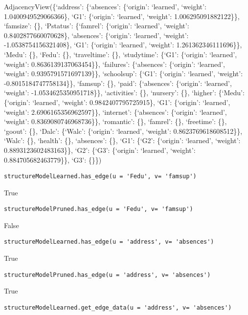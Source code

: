 \documentclass[
]{article}
\begin{document}
AdjacencyView(\{`address': \{`absences': \{`origin': `learned',
`weight': 1.0400949529066366\}, `G1': \{`origin': `learned', `weight':
1.006295091882122\}\}, `famsize': \{\}, `Pstatus': \{`famrel':
\{`origin': `learned', `weight': 0.8402877660070628\}, `absences':
\{`origin': `learned', `weight': -1.0538754156321408\}, `G1':
\{`origin': `learned', `weight': 1.261362346111696\}\}, `Medu': \{\},
`Fedu': \{\}, `traveltime': \{\}, `studytime': \{`G1': \{`origin':
`learned', `weight': 0.8636139137063454\}\}, `failures': \{`absences':
\{`origin': `learned', `weight': 0.9395791571697139\}\}, `schoolsup':
\{`G1': \{`origin': `learned', `weight': -0.8015184747758134\}\},
`famsup': \{\}, `paid': \{`absences': \{`origin': `learned', `weight':
-1.0534625350951718\}\}, `activities': \{\}, `nursery': \{\}, `higher':
\{`Medu': \{`origin': `learned', `weight': 0.9842407795725915\}, `G1':
\{`origin': `learned', `weight': 2.6906165356962597\}\}, `internet':
\{`absences': \{`origin': `learned', `weight': 0.8369080746968736\}\},
`romantic': \{\}, `famrel': \{\}, `freetime': \{\}, `goout': \{\},
`Dalc': \{`Walc': \{`origin': `learned', `weight':
0.8623769618608512\}\}, `Walc': \{\}, `health': \{\}, `absences': \{\},
`G1': \{`G2': \{`origin': `learned', `weight': 0.8893123602483163\}\},
`G2': \{`G3': \{`origin': `learned', `weight': 0.884705682463779\}\},
`G3': \{\}\})

\begin{verbatim}
structureModelLearned.has_edge(u = 'Fedu', v= 'famsup')
\end{verbatim}

True

\begin{verbatim}
structureModelPruned.has_edge(u = 'Fedu', v= 'famsup')
\end{verbatim}

False

\begin{verbatim}
structureModelLearned.has_edge(u = 'address', v= 'absences')
\end{verbatim}

True

\begin{verbatim}
structureModelPruned.has_edge(u = 'address', v= 'absences')
\end{verbatim}

True

\begin{verbatim}
structureModelLearned.get_edge_data(u = 'address', v= 'absences')
\end{verbatim}
\end{document}
